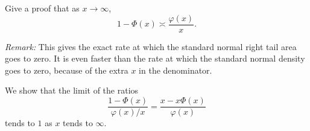 \begin{problem}[Handout 14, \# 15]
  Give a proof that as \(x\to\infty\),
  \[
    1-\Phi(x)\asymp\frac{\varphi(x)}{x}.
  \]

  \noindent \emph{Remark:} This gives the exact rate at which the standard
  normal right tail area goes to zero. It is even faster than the rate at
  which the standard normal density goes to zero, because of the extra
  \(x\) in the denominator.
\end{problem}
\begin{solution}
  We show that the limit of the ratios
  \[
    \frac{1-\Phi(x)}{\varphi(x)/x}=\frac{x-x\Phi(x)}{\varphi(x)}
  \]
  tends to \(1\) as \(x\) tends to \(\infty\).
\end{solution}

